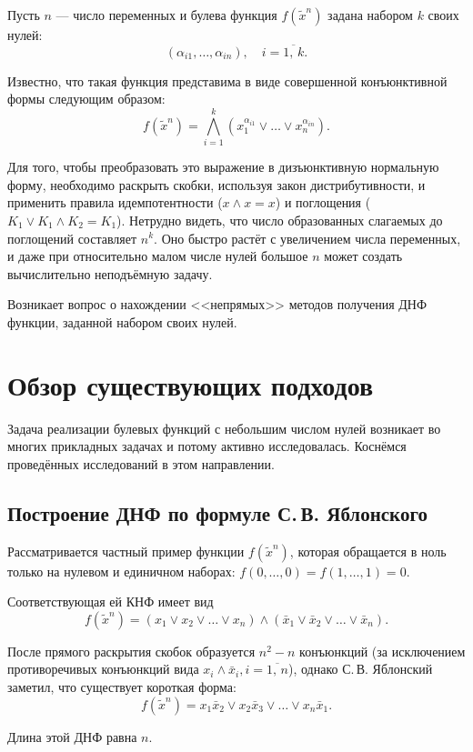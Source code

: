 \documentclass[12pt,a4paper,oneside,fleqn,leqno]{article}
\theoremstyle{definition}
\begin{document}
	Пусть $n$ --- число переменных и булева функция $f(\tilde x^n)$ задана набором $k$ своих нулей:
	$$
		(\alpha_{i1},\ldots,\alpha_{in}),\quad i=\overline{1,\,k}.
	$$\par
	Известно, что такая функция представима в виде совершенной конъюнктивной формы следующим образом:
	$$
		f(\tilde x^n) = \bigwedge_{i = 1}^k (x_1^{\alpha_{i1}} \vee \ldots \vee x_n^{\alpha_{in}}).
	$$\par
	Для того, чтобы преобразовать это выражение в дизъюнктивную нормальную форму, необходимо раскрыть скобки, используя закон дистрибутивности, и применить правила идемпотентности ($x\wedge x = x$) и поглощения ($K_1 \vee K_1\wedge K_2 = K_1$). %
Нетрудно видеть, что число образованных слагаемых до поглощений составляет $n^k.$ Оно быстро растёт с увеличением числа переменных, и даже при относительно малом числе нулей большое $n$ может создать вычислительно неподъёмную задачу.\par
	Возникает вопрос о нахождении <<непрямых>> методов получения ДНФ функции, заданной набором своих нулей.
	\section{Обзор существующих подходов}
		Задача реализации булевых функций с небольшим числом нулей возникает во многих прикладных задачах и потому активно исследовалась. Коснёмся проведённых исследований в этом направлении.
		\subsection{Построение ДНФ по формуле С.\,В. Яблонского}
			Рассматривается частный пример функции $f(\tilde x^n)$, которая обращается в ноль только на нулевом и единичном наборах: $f(0,\ldots,0) = f(1,\ldots,1) = 0.$\par
			Соответствующая ей КНФ имеет вид
			$$
				f(\tilde x^n) = (x_1 \vee x_2 \vee \ldots \vee x_n)\wedge(\bar{x}_1 \vee \bar{x}_2 \vee \ldots \vee \bar{x}_n).
			$$\par
			После прямого раскрытия скобок образуется $n^2 - n$ конъюнкций (за исключением противоречивых конъюнкций вида $x_i\wedge\bar{x}_i, i = \overline{1,\,n}$), однако С.\,В. Яблонский заметил, что существует короткая форма:
			$$
				f(\tilde x^n) = x_1\bar{x}_2 \vee x_2\bar{x}_3 \vee \ldots \vee x_n \bar{x}_1.
			$$\par
			Длина этой ДНФ равна $n.$
\end{document}
